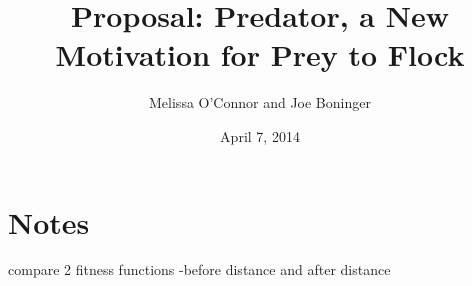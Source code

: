 \documentclass[11pt]{article}
\title{Proposal: Predator, a New Motivation for Prey to Flock}
\author{Melissa O'Connor and Joe Boninger}
\date{April 7, 2014} %
\begin{document}
\maketitle

\section{Notes}
compare 2 fitness functions
        -before distance and after distance        
\end{document}
